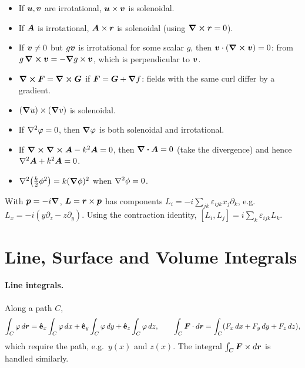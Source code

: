 \begin{example}
\begin{itemize}
    \item If $\bm{u},\bm{v}$ are irrotational, $\bm{u}\times\bm{v}$ is solenoidal.
    \item If $\vect{A}$ is irrotational, $\vect{A}\times\lvect{r}$ is solenoidal (using $\curl\bm{r} = 0$).
    \item If $\bm{v}\neq0$ but $g\bm{v}$ is irrotational for some scalar $g$, then $\bm{v}\cdot(\curl\bm{v}) = 0$: from $g\,\curl\bm{v} = -\grad g\times\bm{v}$, which is perpendicular to $\bm{v}$.
    \item $\curl\vect{F} = \curl\vect{G}$ if $\vect{F} = \vect{G} + \grad f$: fields with the same curl differ by a gradient.
    \item $(\grad u)\times(\grad v)$ is solenoidal.
    \item If $\laplacian\varphi = 0$, then $\grad\varphi$ is both solenoidal and irrotational.
    \item If $\curl\curl\vect{A} - k^2\vect{A} = 0$, then $\div\vect{A} = 0$ (take the divergence) and hence $\laplacian\vect{A} + k^2\vect{A} = 0$.
    \item $\laplacian(\tfrac{k}{2}\phi^2) = k(\grad\phi)^2$ when $\laplacian\phi = 0$.
\end{itemize}
\end{example}

\begin{example}
With $\bm{p} = -i\grad$, $\vect{L} = \lvect{r}\times\lvect{p}$ has components $L_i = -i\sum_{jk}\varepsilon_{ijk}x_j\partial_k$, e.g.\ $L_x = -i(y\partial_z - z\partial_y)$. Using the contraction identity, $[L_i,L_j] = i\sum_k\varepsilon_{ijk}L_k$.
\end{example}

\section{Line, Surface and Volume Integrals}

\paragraph{Line integrals.} Along a path $C$,
\[
    \int_C\varphi\,d\lvect{r} = \uvect{e}_x\int_C\varphi\,dx + \uvect{e}_y\int_C\varphi\,dy + \uvect{e}_z\int_C\varphi\,dz,
    \qquad
    \int_C\vect{F}\cdot d\lvect{r} = \int_C(F_x\,dx + F_y\,dy + F_z\,dz),
\]
which require the path, e.g.\ $y(x)$ and $z(x)$. The integral $\int_C\vect{F}\times d\lvect{r}$ is handled similarly.


